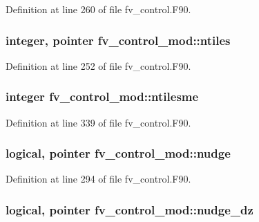 Definition at line 260 of file fv\-\_\-control.\-F90.

\subsubsection[{ntiles}]{\setlength{\rightskip}{0pt plus 5cm}integer, pointer fv\-\_\-control\-\_\-mod\-::ntiles\hspace{0.3cm}{\ttfamily [private]}}\label{classfv__control__mod_a03c69dd485bf4db4a1b65e9865ed9360}


Definition at line 252 of file fv\-\_\-control.\-F90.

\subsubsection[{ntilesme}]{\setlength{\rightskip}{0pt plus 5cm}integer fv\-\_\-control\-\_\-mod\-::ntilesme\hspace{0.3cm}{\ttfamily [private]}}\label{classfv__control__mod_a3d3dfa096dc269b05b2969281d35c453}


Definition at line 339 of file fv\-\_\-control.\-F90.

\subsubsection[{nudge}]{\setlength{\rightskip}{0pt plus 5cm}logical, pointer fv\-\_\-control\-\_\-mod\-::nudge\hspace{0.3cm}{\ttfamily [private]}}\label{classfv__control__mod_a07a467d55363147e21ffdb90196521c5}


Definition at line 294 of file fv\-\_\-control.\-F90.

\subsubsection[{nudge\-\_\-dz}]{\setlength{\rightskip}{0pt plus 5cm}logical, pointer fv\-\_\-control\-\_\-mod\-::nudge\-\_\-dz\hspace{0.3cm}{\ttfamily [private]}}\label{classfv__control__mod_a8ae39c9f86e291e2d1a3d547c013833a}


